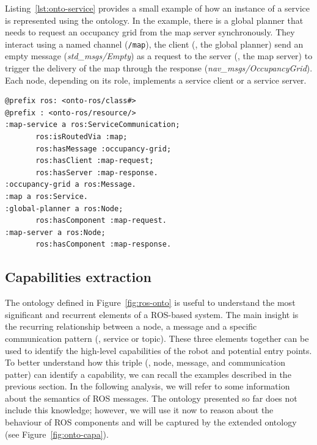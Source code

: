 Listing~\ref{lst:onto-service} provides a small example of how an instance of a service is represented using the ontology. In the example, there is a global planner that needs to request an occupancy grid from the map server synchronously. They interact using a named channel (\texttt{/map}), the client (\ie, the global planner) send an empty message (\textit{std\_msgs/Empty}) as a request to the server (\ie, the map server) to trigger the delivery of the map through the response (\textit{nav\_msgs/OccupancyGrid}). Each node, depending on its role, implements a service client or a service server.

\begin{lstlisting}[frame=tb,caption={Instance of a service-based communication according to the ontology.},label=lst:onto-service]
@prefix ros: <onto-ros/class#>
@prefix : <onto-ros/resource/>
:map-service a ros:ServiceCommunication;
       ros:isRoutedVia :map;
       ros:hasMessage :occupancy-grid;
       ros:hasClient :map-request;
       ros:hasServer :map-response.
:occupancy-grid a ros:Message.
:map a ros:Service.  
:global-planner a ros:Node;
       ros:hasComponent :map-request.
:map-server a ros:Node;
       ros:hasComponent :map-response.
 \end{lstlisting}
 
\subsection{Capabilities extraction}
\label{sec:cap-ext}
The ontology defined in Figure~\ref{fig:ros-onto} is useful to understand the most significant and recurrent elements of a ROS-based system. The main insight is the recurring relationship between a node, a message and a specific communication pattern (\ie, service or topic). These three elements together can be used to identify the high-level capabilities of the robot and potential entry points. To better understand how this triple (\ie, node, message, and communication patter) can identify a capability, we can recall the examples described in the previous section. In the following analysis, we will refer to some information about the semantics of ROS messages. The ontology presented so far does not include this knowledge; however, we will use it now to reason about the behaviour of ROS components and will be captured by the extended ontology (see Figure~\ref{fig:onto-capa}).

